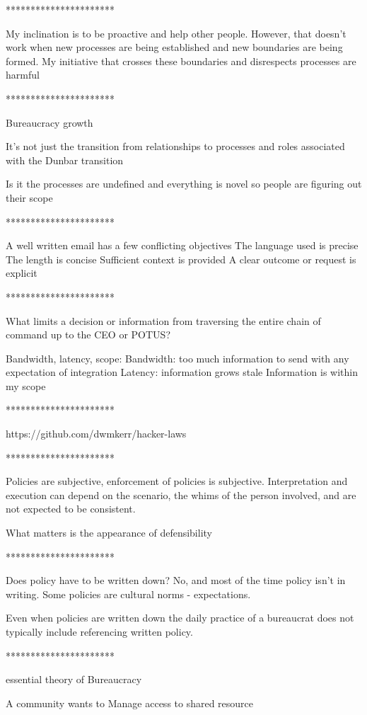 **********************

My inclination is to be proactive and help other people. However, that doesn't work when new processes are being established and new boundaries are being formed. My initiative that crosses these boundaries and disrespects processes are harmful

**********************

Bureaucracy growth

It's not just the transition from relationships to processes and roles associated with the Dunbar transition 

Is it the processes are undefined and everything is novel so people are figuring out their scope

**********************

A well written email has a few conflicting objectives 
The language used is precise 
The length is concise 
Sufficient context is provided 
A clear outcome or request is explicit 


**********************

What limits a decision or information from traversing the entire chain of command up to the CEO or POTUS?

Bandwidth, latency, scope:
Bandwidth: too much information to send with any expectation of integration 
Latency: information grows stale 
Information is within my scope



**********************

https://github.com/dwmkerr/hacker-laws

**********************

Policies are subjective, enforcement of policies is subjective. Interpretation and execution can depend on the scenario, the whims of the person involved, and are not expected to be consistent.

What matters is the appearance of defensibility

**********************

Does policy have to be written down? 
No, and most of the time policy isn't in writing. Some policies are cultural norms - expectations. 

Even when policies are written down the daily practice of a bureaucrat does not typically include referencing written policy.

**********************

essential theory of Bureaucracy

A community wants to Manage access to shared resource

